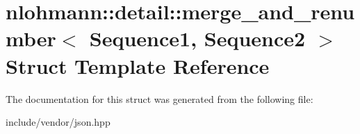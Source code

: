\hypertarget{structnlohmann_1_1detail_1_1merge__and__renumber}{}\section{nlohmann\+:\+:detail\+:\+:merge\+\_\+and\+\_\+renumber$<$ Sequence1, Sequence2 $>$ Struct Template Reference}
\label{structnlohmann_1_1detail_1_1merge__and__renumber}


The documentation for this struct was generated from the following file\+:\begin{DoxyCompactItemize}
\item 
include/vendor/json.\+hpp\end{DoxyCompactItemize}

